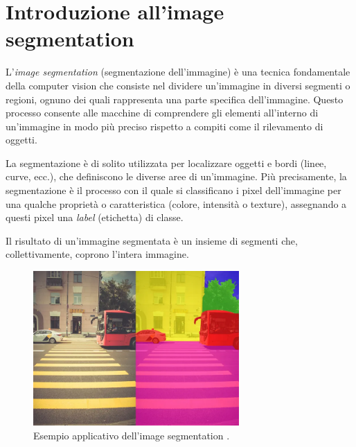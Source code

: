 \section{Introduzione all'image segmentation}
L'\textit{image segmentation} (segmentazione dell'immagine) 
\cite{ImageSegmentation_Gradient,ImageSegmentation_Labeller,ImageSegmentation_Provino,Imagesegmentation_pulapakura}
è una tecnica fondamentale della computer vision che consiste nel dividere un'immagine in 
diversi segmenti o regioni, ognuno dei quali rappresenta una parte specifica dell'immagine. 
Questo processo consente alle macchine di comprendere gli elementi all'interno di un'immagine in modo 
più preciso rispetto a compiti come il rilevamento di oggetti.


La segmentazione è di solito utilizzata per localizzare oggetti e bordi (linee, curve, ecc.), 
che definiscono le diverse aree di un'immagine. 
Più precisamente, la segmentazione è il processo con il quale si classificano i pixel dell'immagine 
per una qualche proprietà o caratteristica (colore, intensità o texture), assegnando a questi pixel
una \textit{label} (etichetta) di classe.
 
Il risultato di un'immagine segmentata è un insieme di segmenti che, collettivamente, coprono 
l'intera immagine.


\begin{figure}[H]
    \centering
    \includegraphics[width=0.70\textwidth]{Immagini/Generiche/esempioImgSegmentation.png}
    \caption{Esempio applicativo dell'image segmentation \cite{Imagesegmentation_pulapakura}.}
\end{figure}

